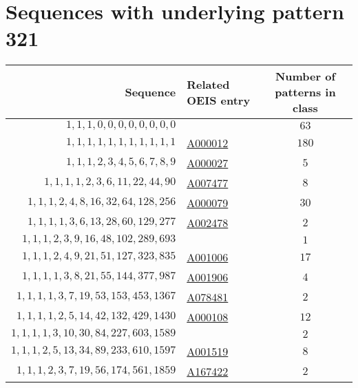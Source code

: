 \section{Sequences with underlying pattern 321}
\begin{longtabu}{|r|l|c|}
    \hline
    Sequence & Related OEIS entry & Number of patterns in class\\
    \hline
    \endfirsthead
    \hline
    \endhead
    \hline
    \endfoot
    \(    1,    1,    1,    0,    0,    0,    0,    0,    0,    0,    0\) & 	& \(63\)\\
    \(    1,    1,    1,    1,    1,    1,    1,    1,    1,    1,    1\) & \href{http://oeis.org/A000012}{A000012} & \(180\)\\
    \(    1,    1,    1,    2,    3,    4,    5,    6,    7,    8,    9\) &	\href{http://oeis.org/A000027}{A000027} & \(5\)\\
    \(    1,    1,    1,    1,    2,    3,    6,   11,   22,   44,   90\) &	\href{http://oeis.org/A007477}{A007477} & \(8\)\\
    \(    1,    1,    1,    2,    4,    8,   16,   32,   64,  128,  256\) &	\href{http://oeis.org/A000079}{A000079} & \(30\)\\
    \(    1,    1,    1,    1,    3,    6,   13,   28,   60,  129,  277\) &	\href{http://oeis.org/A002478}{A002478} & \(2\)\\
    \(    1,    1,    1,    2,    3,    9,   16,   48,  102,  289,  693\) &  & \(1\)\\
    \(    1,    1,    1,    2,    4,    9,   21,   51,  127,  323,  835\) &	\href{http://oeis.org/A001006}{A001006} & \(17\)\\
    \(    1,    1,    1,    1,    3,    8,   21,   55,  144,  377,  987\) &	\href{http://oeis.org/A001906}{A001906} & \(4\)\\
    \(    1,    1,    1,    1,    3,    7,   19,   53,  153,  453, 1367\) &	\href{http://oeis.org/A078481}{A078481} & \(2\)\\
    \(    1,    1,    1,    1,    2,    5,   14,   42,  132,  429, 1430\) &	\href{http://oeis.org/A000108}{A000108} & \(12\)\\
    \(    1,    1,    1,    1,    3,   10,   30,   84,  227,  603, 1589\) & 	& \(2\)\\
    \(    1,    1,    1,    2,    5,   13,   34,   89,  233,  610, 1597\) &	\href{http://oeis.org/A001519}{A001519} & \(8\)\\
    \(    1,    1,    1,    2,    3,    7,   19,   56,  174,  561, 1859\) &	\href{http://oeis.org/A167422}{A167422} & \(2\)\\

\end{longtabu}
